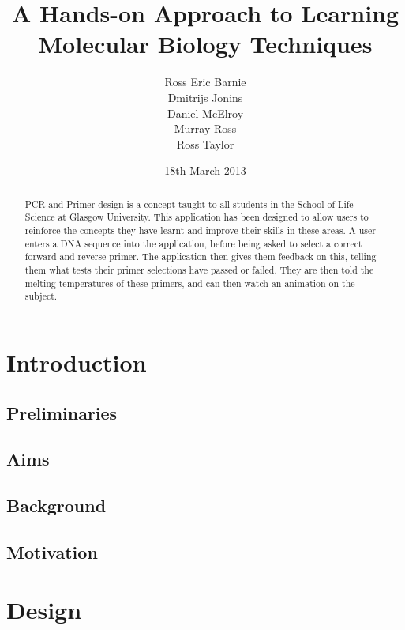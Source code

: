 \documentclass{l3proj}
\title{A Hands-on Approach to Learning Molecular Biology Techniques}
\author{
  Ross Eric Barnie \\
  Dmitrijs Jonins \\
  Daniel McElroy \\
  Murray Ross \\
  Ross Taylor
}
\date{18th March 2013}
\begin{document}
\maketitle
\begin{abstract}

PCR and Primer design is a concept taught to all students in the School of Life Science at Glasgow
University. This application has been designed to allow users to reinforce the concepts they have
learnt and improve their skills in these areas. A user enters a DNA sequence into the application,
before being asked to select a correct forward and reverse primer. The application then gives them
feedback on this, telling them what tests their primer selections have passed or failed. They are then
told the melting temperatures of these primers, and can then watch an animation on the subject.

\end{abstract}

\educationalconsent
\tableofcontents

\chapter{Introduction}
\label{intro}

\section{Preliminaries}
\label{intro:prelims}


\section{Aims}
\label{intro:aims}


\section{Background}
\label{intro:background}


\section{Motivation}
\label{intro:motiv}


\chapter{Design}
\label{design}
\end{document}
